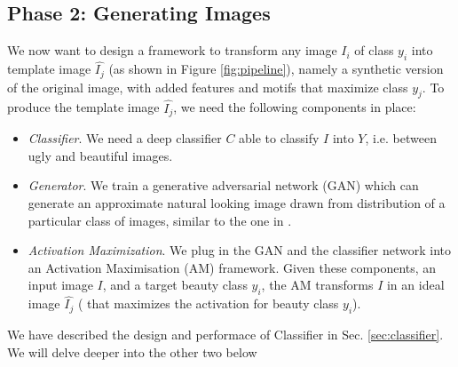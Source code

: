 \subsection{Phase 2: Generating Images}
\par 
We now want to design a framework to transform any image $I_i$ of class $y_i$ into template image $\hat{I_j}$ (as shown in Figure \ref{fig:pipeline}), namely a synthetic version of the original image, with added features and motifs that maximize class $y_j$. 
To produce the template image $\hat{I_j}$, we need the following components in place:
\begin{itemize}
	\item {\textit{Classifier}}. We need a deep classifier $C$ able to classify $I$ into $Y$, i.e. between ugly and beautiful images. %
	
	\item \textit{Generator}. We train a generative adversarial network (GAN) which can generate an approximate natural looking image drawn from distribution of a particular class of images, similar to the one  in \cite{dosovitskiy2016inverting}. 
	
	\item \textit{Activation Maximization}. We plug in the GAN and the classifier network into an Activation Maximisation (AM) framework. Given these components, an input image $I$, and a target beauty class $y_i$, the AM transforms $I$ in an ideal image $\hat{I_j}$ ( that maximizes the activation for beauty class $y_i$).	
\end{itemize}
 
 We have described the design and performace of Classifier in Sec. \ref{sec:classifier}. We will delve deeper into the other two below
 
